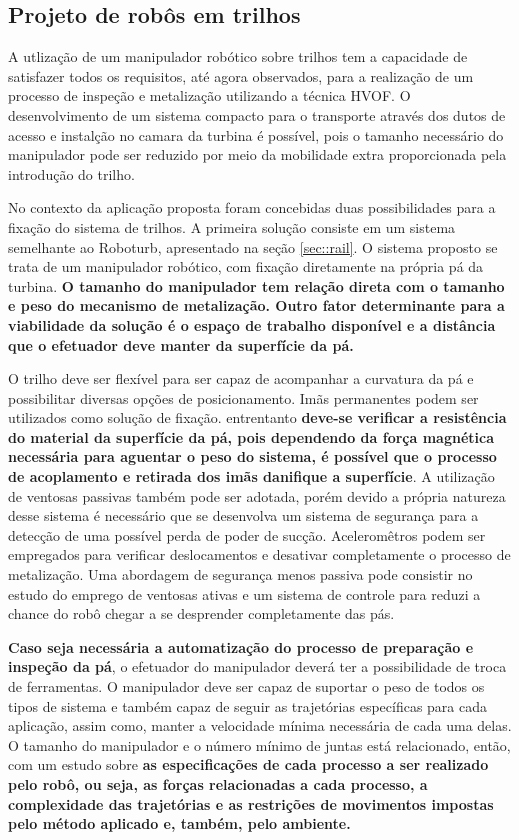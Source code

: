 \subsection{Projeto de robôs em trilhos}\label{proj_rail}
 
A utlização de um manipulador robótico sobre trilhos tem a
capacidade de satisfazer todos os requisitos, até agora observados, para a realização de um
processo de inspeção e metalização utilizando a técnica HVOF. O desenvolvimento
de um sistema compacto para o transporte através dos dutos de acesso e instalção
no camara da turbina é possível, pois o tamanho necessário do manipulador pode
ser reduzido por meio da mobilidade extra proporcionada pela introdução do
trilho.

No contexto da aplicação proposta foram concebidas duas possibilidades para a
fixação do sistema de trilhos. A primeira solução consiste em um sistema
semelhante ao Roboturb, apresentado na seção \ref{sec::rail}. O sistema proposto
se trata de um manipulador robótico, com fixação diretamente na própria pá da
turbina. \textbf{O tamanho do manipulador tem relação direta com o tamanho e
peso do mecanismo de metalização. Outro fator determinante para a viabilidade da
solução é o espaço de trabalho disponível e a distância que o efetuador deve
manter da superfície da pá.}

O trilho deve ser flexível para ser capaz de acompanhar a curvatura da pá e
possibilitar diversas opções de posicionamento. Imãs permanentes podem ser
utilizados como solução de fixação. entrentanto \textbf{deve-se verificar a
resistência do material da superfície da pá, pois dependendo da força magnética
necessária para aguentar o peso do sistema, é possível que o processo de
acoplamento e retirada dos imãs danifique a superfície}. A utilização de
ventosas passivas também pode ser adotada, porém devido a própria natureza desse
sistema é necessário que se desenvolva um sistema de segurança para a detecção
de uma possível perda de poder de sucção. Aceleromêtros podem ser empregados
para verificar deslocamentos e desativar completamente o processo de
metalização. Uma abordagem de segurança menos passiva pode consistir no estudo
do emprego de ventosas ativas e um sistema de controle para reduzi a chance do
robô chegar a se desprender completamente das pás.

\textbf{Caso seja necessária a automatização do processo de preparação e
inspeção da pá}, o efetuador do manipulador deverá ter a possibilidade de troca 
de ferramentas. O manipulador deve ser capaz de suportar o peso de todos os
tipos de sistema e também capaz de seguir as trajetórias específicas para cada
aplicação, assim como, manter a velocidade mínima necessária de cada uma delas.
O tamanho do manipulador e o número mínimo de juntas está relacionado, então,
com um estudo sobre \textbf{as especificações de cada processo a ser realizado
pelo robô, ou seja, as forças relacionadas a cada processo, a complexidade das
trajetórias e as restrições de movimentos impostas pelo método aplicado e,
também, pelo ambiente.}


